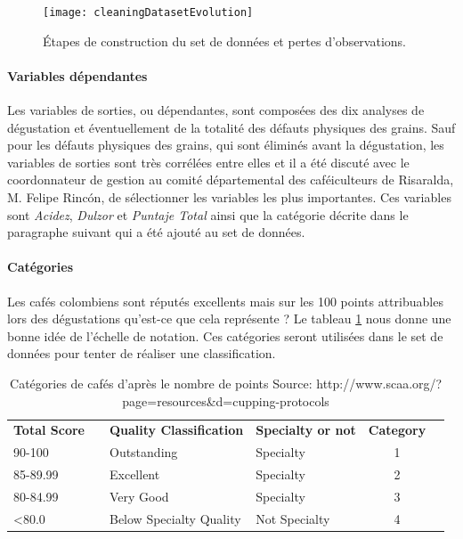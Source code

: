 \begin{figure}[H]
	\centering
	\texttt{[image: cleaningDatasetEvolution]}
	\caption{\label{DatasetMaking2} Étapes de construction du set de données et pertes d'observations.}
\end{figure}


\paragraph{Variables dépendantes\label{VarDep}} Les variables de sorties, ou dépendantes, sont composées des dix analyses de dégustation et éventuellement de la totalité des défauts physiques des grains. Sauf pour les défauts physiques des grains, qui sont éliminés avant la dégustation, les variables de sorties sont très corrélées entre elles et il a été discuté avec le coordonnateur de gestion au comité départemental des caféiculteurs de Risaralda, M. Felipe Rincón, de sélectionner les variables les plus importantes. Ces variables sont \textit{Acidez}, \textit{Dulzor} et \textit{Puntaje Total} ainsi que la catégorie décrite dans le paragraphe suivant qui a été ajouté au set de données.  

\paragraph{Catégories}
Les cafés colombiens sont réputés excellents mais sur les 100 points attribuables lors des dégustations qu'est-ce que cela représente ? Le tableau \ref{categoriesCafe} nous donne une bonne idée de l'échelle de notation. Ces catégories seront utilisées dans le set de données pour tenter de réaliser une classification. 
\begin{table}[H]
	\centering
	\caption{Catégories de cafés d'après le nombre de points \newline Source: http://www.scaa.org/?page=resources\&d=cupping-protocols \label{categoriesCafe}}
	\begin{tabular}{llllcl}
		\textbf{Total Score}   &  & \textbf{Quality Classification}   & \textbf{Specialty or not}  & \textbf{Category} \\
		
		90-100        &  & Outstanding              & Specialty         &  1                    \\
		85-89.99      &  & Excellent                & Specialty         &  2                    \\
		80-84.99      &  & Very Good                & Specialty         &  3                    \\
		\textless80.0 &  & Below Specialty Quality & Not Specialty     &  4                   
	\end{tabular}
\end{table}




